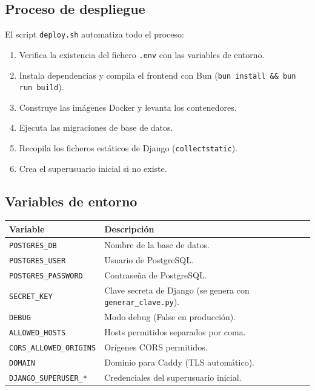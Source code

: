 \documentclass[12pt, a4paper, twoside]{article}
\begin{document}
\subsection{Proceso de despliegue}

El script \texttt{deploy.sh} automatiza todo el proceso:

\begin{enumerate}
  \item Verifica la existencia del fichero \texttt{.env} con las variables de entorno.
  \item Instala dependencias y compila el frontend con Bun (\texttt{bun install \&\& bun run build}).
  \item Construye las imágenes Docker y levanta los contenedores.
  \item Ejecuta las migraciones de base de datos.
  \item Recopila los ficheros estáticos de Django (\texttt{collectstatic}).
  \item Crea el superusuario inicial si no existe.
\end{enumerate}

\subsection{Variables de entorno}

\begin{longtable}{lp{8cm}}
  \toprule
  \textbf{Variable} & \textbf{Descripción} \\
  \midrule
  \texttt{POSTGRES\_DB} & Nombre de la base de datos. \\
  \texttt{POSTGRES\_USER} & Usuario de PostgreSQL. \\
  \texttt{POSTGRES\_PASSWORD} & Contraseña de PostgreSQL. \\
  \texttt{SECRET\_KEY} & Clave secreta de Django (se genera con \texttt{generar\_clave.py}). \\
  \texttt{DEBUG} & Modo debug (False en producción). \\
  \texttt{ALLOWED\_HOSTS} & Hosts permitidos separados por coma. \\
  \texttt{CORS\_ALLOWED\_ORIGINS} & Orígenes CORS permitidos. \\
  \texttt{DOMAIN} & Dominio para Caddy (TLS automático). \\
  \texttt{DJANGO\_SUPERUSER\_*} & Credenciales del superusuario inicial. \\
  \bottomrule
\end{longtable}
\end{document}
